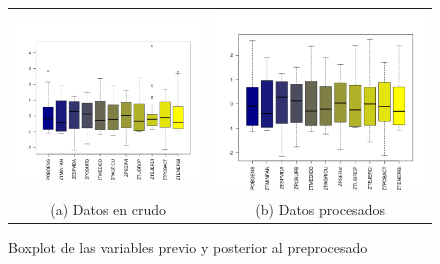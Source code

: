 \documentclass[letterpaper,11pt]{article}
\begin{document}
\begin{figure}[h]
\begin{tabular}{cc}
  \includegraphics[scale=0.4]{./img/boxplot_enteros.png} &   \includegraphics[scale=0.4]{./img/boxplot_procesados.png} \\
(a) Datos en crudo & (b) Datos procesados \\[6pt]
\end{tabular}
\caption{Boxplot de las variables previo y posterior al preprocesado}
\label{boxplot}
\end{figure}
\end{document}
